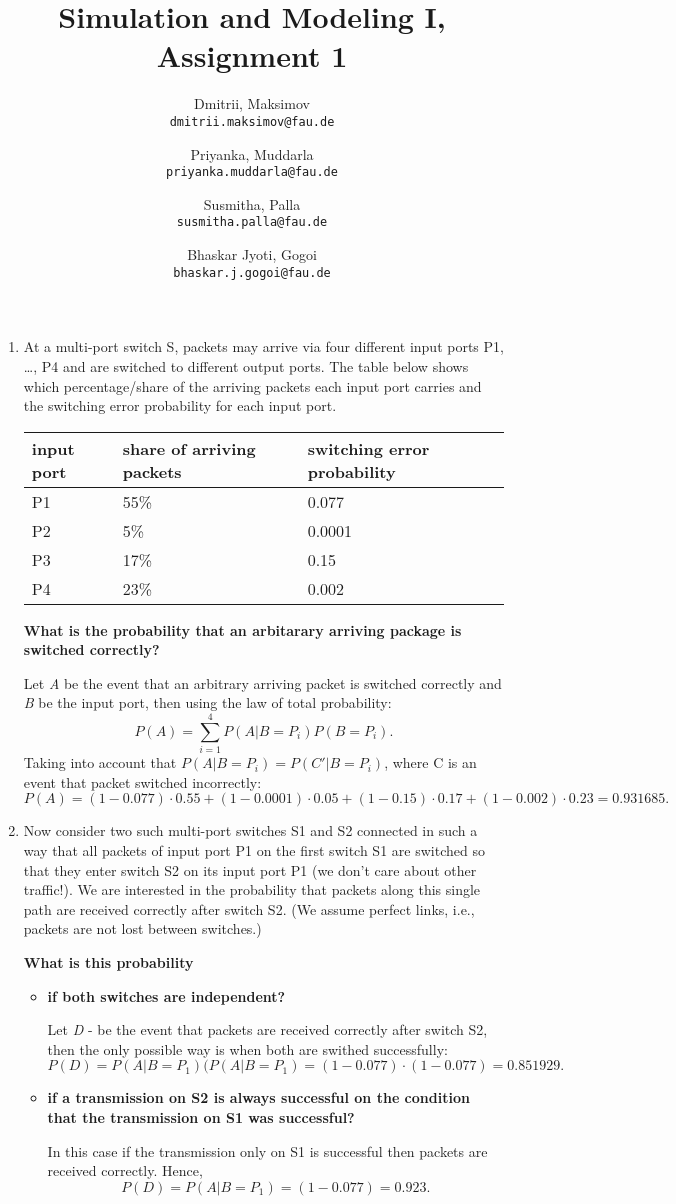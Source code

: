 \documentclass{homework}
\title{Simulation and Modeling I, Assignment 1}
\author{
  Dmitrii, Maksimov\\
  \texttt{dmitrii.maksimov@fau.de}
  \and
  Priyanka, Muddarla\\
  \texttt{priyanka.muddarla@fau.de}
  \and
  Susmitha, Palla\\
  \texttt{susmitha.palla@fau.de}
  \and
  Bhaskar Jyoti, Gogoi\\
  \texttt{bhaskar.j.gogoi@fau.de}
}
\begin{document}
\maketitle

\exercise
\begin{enumerate}[label=(\alph*)]
	\item At a multi-port switch S, packets may arrive via four different input ports P1, \dots, P4 and are switched to different output ports. The table below shows which percentage/share of the arriving packets each input port carries and the switching error probability for each input port.
		\begin{center}
		    	\begin{tabular}{| l | l | l |}
		    	\hline
			    input port & share of arriving packets & switching error probability \\ \hline
			    P1 & 55\% & 0.077 \\ \hline
			    P2 & 5\% & 0.0001 \\ \hline
			    P3 & 17\% & 0.15 \\ \hline
			    P4 & 23\% & 0.002 \\
			\hline
			\end{tabular}
		\end{center}
	\textbf{What is the probability that an arbitarary arriving package is switched correctly?}
	
	Let \emph{A} be the event that an arbitrary arriving packet is switched correctly and \emph{B} be the input port, then using the law of total probability: \[P(A)=\sum_{i=1}^4 P(A|B=P_i)P(B=P_i).\] Taking into account that $P(A|B=P_i) = P(C'|B=P_i)$, where C is an event that packet switched incorrectly:
\[P(A) = (1-0.077)\cdot 0.55 + (1-0.0001)\cdot 0.05 + (1-0.15)\cdot 0.17 + (1-0.002)\cdot 0.23 = 0.931685.\]
	\item Now consider two such multi-port switches S1 and S2 connected in such a way that all packets of input port P1 on the first switch S1 are switched so that they enter switch S2 on its input port P1 (we don’t care about other traffic!). We are interested in the probability that packets along this single path are received correctly after switch S2. (We assume perfect links, i.e., packets are not lost between switches.)

\textbf{What is this probability}
\begin{itemize}[label={--}]
	\item \textbf{if both switches are independent?}

	Let \emph{D} - be the event that packets are received correctly after switch S2, then the only possible way is when both are swithed successfully:
	\[P(D) = P(A|B=P_1)(P(A|B=P_1) = (1-0.077)\cdot (1-0.077) = 0.851929.\]
	\item \textbf{if a transmission on S2 is always successful on the condition that the transmission on S1 was successful?}

	In this case if the transmission only on S1 is successful then packets are received correctly. Hence, \[P(D) = P(A|B=P_1) = (1-0.077) = 0.923.\]
\end{itemize}
\end{enumerate}
\end{document}
